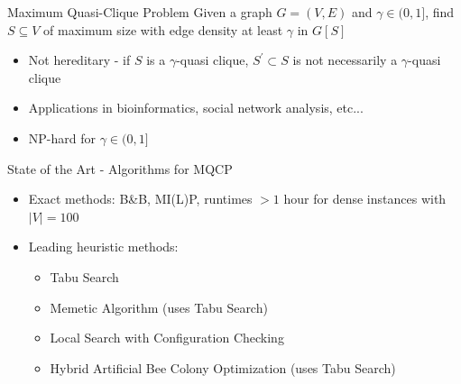 \documentclass{beamer}
\begin{document}
\begin{frame}{Maximum Quasi-Clique Problem}
    Given a graph $G = (V,E)$ and $\gamma \in (0,1]$, find $S \subseteq V$ of maximum size with edge density at least $\gamma$ in $G[S]$
    \begin{itemize}
        \item<1-> Not hereditary - if $S$ is a $\gamma$-quasi clique, $S^\prime \subset S$ is not necessarily a $\gamma$-quasi clique
        \item<2-> Applications in bioinformatics, social network analysis, etc...
        \item<3-> NP-hard for $\gamma \in (0,1]$ \cite{pattillo_maximum_2013}
    \end{itemize}
\end{frame}

\begin{frame}{State of the Art - Algorithms for MQCP}
    \begin{itemize}
        \item<1-> Exact methods: B\&B, MI(L)P, runtimes $> 1$ hour for dense instances with $|V|=100$
        \item<2-> Leading heuristic methods:
        \begin{itemize}
            \item<3-> Tabu Search \cite{djeddi_extension_2019}
            \item<4-> Memetic Algorithm (uses Tabu Search) \cite{zhou_opposition-based_2020}
            \item<5-> Local Search with Configuration Checking \cite{chen_nuqclq_2021}
            \item<6-> Hybrid Artificial Bee Colony Optimization (uses Tabu Search) \cite{peng_solving_2021}
        \end{itemize}
    \end{itemize}
\end{frame}
\end{document}
